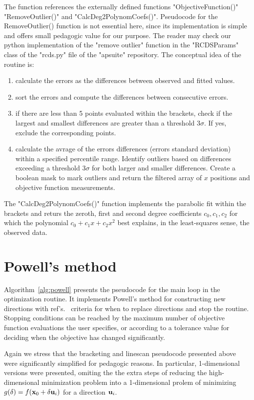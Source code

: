 The function references the externally defined functions "ObjectiveFunction()" "RemoveOutlier()" and "CalcDeg2PolynomCoefs()". Pseudocode for the RemoveOutlier() function is not essential here, since its implementation is simple and offers small pedagogic value for our purpose. The reader may check our python implementation of  the "remove outlier" function in the "RCDSParams" class of the "rcds.py" file of the "apsuite" repository. The conceptual idea of the routine is:
\begin{enumerate}
    \item calculate the errors as the differences between observed and fitted values.
    \item sort the errors and compute the differences between consecutive errors.
    \item if there are less than 5 points evaluated within the brackets, check if the largest and smallest differences are greater than a threshold $3\sigma$. If yes, exclude the corresponding points.
    \item calculate the avrage of the errors differences (errors standard deviation) within a specified percentile range. Identify outliers based on differences exceeding a threshold $3\sigma$ for both larger and smaller differences. Create a boolean mask to mark outliers and return the filtered array of $x$ positions and objective function measurements.
\end{enumerate}

The "CalcDeg2PolynomCoefs()" function implements the parabolic fit within the brackets and returs the zeroth, first and second degree coefficients $c_0, c_1, c_2$ for which the polynomial $c_0 + c_1x + c_2 x^2$ best explains, in the least-squares sense, the observed data.

\section{Powell's method}
Algorithm~\ref{alg:powell} presents the pseudocode for the main loop in the optimization routine. It implements Powell's method for constructing new directions with ref's.~\cite[section 10.7]{press_numerical_2007} criteria for when to replace directions and stop the routine. Stopping conditions can be reached by the maximum number of objective function evaluations the user specifies, or according to a tolerance value for deciding when the objective has changed significantly.

Again we stress that the bracketing and linescan pseudocode presented above were significantly simplified for pedagogic reasons. In particular, 1-dimensional versions were presented, omiting the the extra steps of reducing the high-dimensional minimization problem into a 1-dimensional prolem of minimizing $g(\delta) = f(\vb{x}_0 + \delta \vb{u}_i)$ for a direction $\vb{u}_i$.

